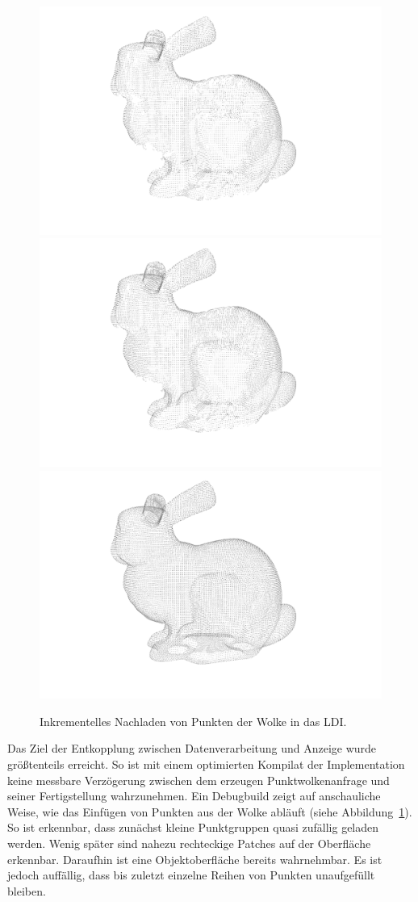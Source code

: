 \documentclass[hyperref, beleg, german, final, twoside]{cgvpub}
\begin{document}
\begin{figure}
	\includegraphics[width = .48\linewidth]{images/incrementalLoading/107}
	\includegraphics[width = .48\linewidth]{images/incrementalLoading/109}%
	\includegraphics[width = .48\linewidth]{images/incrementalLoading/115}
	\caption{Inkrementelles Nachladen von Punkten der Wolke in das LDI.}%
	\label{img:incload}
\end{figure}

Das Ziel der Entkopplung zwischen Datenverarbeitung und Anzeige wurde
größtenteils erreicht. So ist mit einem optimierten Kompilat der Implementation
keine messbare Verzögerung zwischen dem erzeugen Punktwolkenanfrage und seiner
Fertigstellung wahrzunehmen. Ein Debugbuild zeigt auf anschauliche Weise, wie
das Einfügen von Punkten aus der Wolke abläuft (siehe
Abbildung~\ref{img:incload}). So ist erkennbar, dass zunächst kleine
Punktgruppen quasi zufällig geladen werden. Wenig später sind nahezu
rechteckige Patches auf der Oberfläche erkennbar. Daraufhin ist eine
Objektoberfläche bereits wahrnehmbar. Es ist jedoch auffällig, dass bis zuletzt
einzelne Reihen von Punkten unaufgefüllt bleiben.
\end{document}
